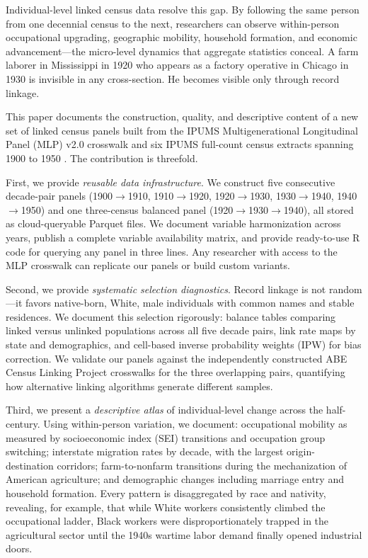 \documentclass[12pt]{article}
\begin{document}
Individual-level linked census data resolve this gap. By following the same person from one decennial census to the next, researchers can observe within-person occupational upgrading, geographic mobility, household formation, and economic advancement---the micro-level dynamics that aggregate statistics conceal. A farm laborer in Mississippi in 1920 who appears as a factory operative in Chicago in 1930 is invisible in any cross-section. He becomes visible only through record linkage.

This paper documents the construction, quality, and descriptive content of a new set of linked census panels built from the IPUMS Multigenerational Longitudinal Panel (MLP) v2.0 crosswalk \citep{helgertz2023} and six IPUMS full-count census extracts spanning 1900 to 1950 \citep{ruggles2024}. The contribution is threefold.

First, we provide \textit{reusable data infrastructure}. We construct five consecutive decade-pair panels (1900$\rightarrow$1910, 1910$\rightarrow$1920, 1920$\rightarrow$1930, 1930$\rightarrow$1940, 1940$\rightarrow$1950) and one three-census balanced panel (1920$\rightarrow$1930$\rightarrow$1940), all stored as cloud-queryable Parquet files. We document variable harmonization across years, publish a complete variable availability matrix, and provide ready-to-use R code for querying any panel in three lines. Any researcher with access to the MLP crosswalk can replicate our panels or build custom variants.

Second, we provide \textit{systematic selection diagnostics}. Record linkage is not random---it favors native-born, White, male individuals with common names and stable residences. We document this selection rigorously: balance tables comparing linked versus unlinked populations across all five decade pairs, link rate maps by state and demographics, and cell-based inverse probability weights (IPW) for bias correction. We validate our panels against the independently constructed ABE Census Linking Project crosswalks \citep{abramitzky2012, abramitzky2014, abramitzky2021} for the three overlapping pairs, quantifying how alternative linking algorithms generate different samples.

Third, we present a \textit{descriptive atlas} of individual-level change across the half-century. Using within-person variation, we document: occupational mobility as measured by socioeconomic index (SEI) transitions and occupation group switching; interstate migration rates by decade, with the largest origin-destination corridors; farm-to-nonfarm transitions during the mechanization of American agriculture; and demographic changes including marriage entry and household formation. Every pattern is disaggregated by race and nativity, revealing, for example, that while White workers consistently climbed the occupational ladder, Black workers were disproportionately trapped in the agricultural sector until the 1940s wartime labor demand finally opened industrial doors.
\end{document}
